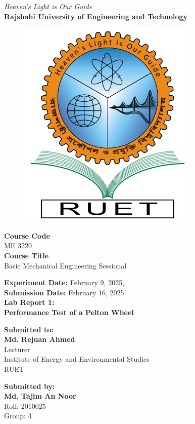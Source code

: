 \vspace*{\fill}
\begin{center}

    \emph{Heaven's Light is Our Guide} \\
    \textbf{Rajshahi University of Engineering and Technology} \\

    \begin{figure}[H]
        \centering
        \includegraphics[scale=.34]{images/RUET_logo.png}
        \label{fig:ruet_logo}
    \end{figure}
    \vspace{5mm}

    \textbf{Course Code}\\
    ME 3220\\
    \vspace{3mm}
    \textbf{Course Title}\\
    Basic Mechanical Engineering Sessional

    \vspace{5mm}
    \textbf{Experiment Date:} {February 9, 2025},\\
    \textbf{Submission Date:} {February 16, 2025}\\

    \vspace{5mm}
    \textbf{Lab Report 1: \\
        Performance Test of a Pelton Wheel}

    \vspace{10mm}

    \textbf{Submitted to:} \\
    \textbf{Md. Rejuan Ahmed} \\
    Lecturer \\
    Institute of Energy and Environmental Studies \\
    RUET
    \vspace{8mm}

    \textbf{Submitted by:} \\
    \textbf{Md. Tajim An Noor} \\
    Roll: 2010025\\
    Group: 4

\end{center}
\vspace*{\fill}
